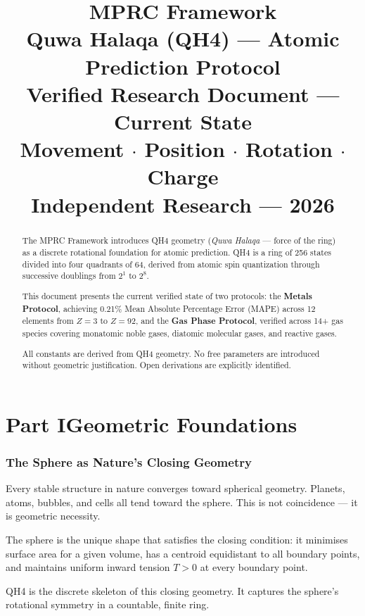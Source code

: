 \documentclass[12pt,a4paper]{article}
\title{%
  \textbf{MPRC Framework}\\[4pt]
  \large Quwa Halaqa (QH4) --- Atomic Prediction Protocol\\[2pt]
  \normalsize Verified Research Document --- Current State\\[2pt]
  \small Movement $\cdot$ Position $\cdot$ Rotation $\cdot$ Charge\\[6pt]
  \normalfont\normalsize Independent Research --- 2026
}
\author{}
\date{}
\theoremstyle{definition}
\begin{document}
\maketitle
\thispagestyle{empty}
\tableofcontents
\newpage

\begin{abstract}
The MPRC Framework introduces QH4 geometry (\textit{Quwa Halaqa} --- force of the ring) as a discrete rotational foundation for atomic prediction. QH4 is a ring of 256 states divided into four quadrants of 64, derived from atomic spin quantization through successive doublings from $2^{1}$ to $2^{8}$.

This document presents the current verified state of two protocols: the \textbf{Metals Protocol}, achieving 0.21\% Mean Absolute Percentage Error (MAPE) across 12 elements from $Z=3$ to $Z=92$, and the \textbf{Gas Phase Protocol}, verified across 14+ gas species covering monatomic noble gases, diatomic molecular gases, and reactive gases.

All constants are derived from QH4 geometry. No free parameters are introduced without geometric justification. Open derivations are explicitly identified.
\end{abstract}

\part*{Part I\quad Geometric Foundations}

\section{The Sphere as Nature's Closing Geometry}

Every stable structure in nature converges toward spherical geometry. Planets, atoms, bubbles, and cells all tend toward the sphere. This is not coincidence --- it is geometric necessity.

The sphere is the unique shape that satisfies the closing condition: it minimises surface area for a given volume, has a centroid equidistant to all boundary points, and maintains uniform inward tension $T > 0$ at every boundary point.

QH4 is the discrete skeleton of this closing geometry. It captures the sphere's rotational symmetry in a countable, finite ring.
\end{document}
